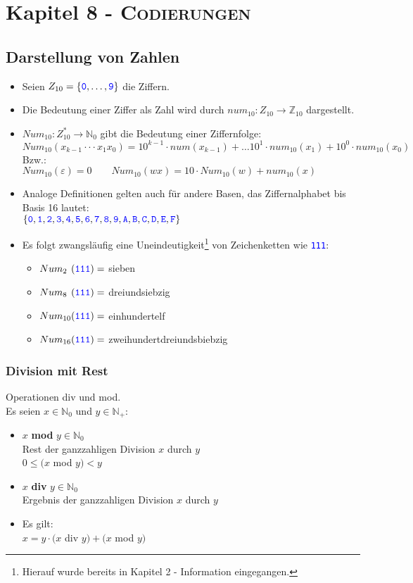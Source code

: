 \documentclass{article}
\newcommand{\N}{\mathbb{N_+}} %
\newcommand{\Nz}{{\mathbb{N}_0}} %
\newcommand{\Z}{\mathbb{Z}} %
\newcommand{\kapitel}[2]{Kapitel #1 - \textsc{#2}}
\newcommand{\blue}[1]{\textcolor{blue}{#1}}
\newcommand{\important}[1]{\textcolor{importantColor}{#1}}
\newcommand{\word}[1]{\blue{\texttt{#1}}}
\newcommand{\set}[1]{\{#1\}}
\newcommand{\anfuehrung}[1]{\flqq #1\frqq}
\begin{document}
\newpage
\section{\kapitel{8}{Codierungen}}
\subsection{Darstellung von Zahlen}
\begin{itemize}
    \item Seien $Z_{10}=\set{\word{0},\dots,\word{9}}$ die Ziffern.
    \item Die Bedeutung einer Ziffer als Zahl wird durch $num_{10}:Z_{10}\to\Z_{10}$ dargestellt.
    \item $Num_{10}:Z_{10}^*\to\Nz$ gibt die Bedeutung einer Ziffernfolge:\\
    $Num_{10}(x_{k-1}\cdot\cdot\cdot x_1x_0)=10^{k-1}\cdot num(x_{k-1})+\dots 10^1\cdot num_{10}(x_1)+10^0\cdot num_{10}(x_0)$\\
    Bzw.:\\
    $Num_{10}(\varepsilon)=0\qquad Num_{10}(wx)=10\cdot Num_{10}(w)+ num_{10}(x)$
    \item Analoge Definitionen gelten auch für andere Basen, das Ziffernalphabet bis Basis 16 lautet:\\
    $\set{\word{0},\word{1},\word{2},\word{3},\word{4},\word{5},\word{6},\word{7},\word{8},\word{9},\word{A},\word{B},\word{C},\word{D},\word{E},\word{F}}$
    \item Es folgt zwangsläufig eine Uneindeutigkeit\footnote{Hierauf wurde bereits in Kapitel 2 - Information eingegangen.} von Zeichenketten wie \word{111}:
    \begin{itemize}
        \item $Num_{2\hphantom{0}}(\word{111}) = $ \anfuehrung{sieben}
        \item $Num_{8\hphantom{0}}(\word{111}) = $ \anfuehrung{dreiundsiebzig}
        \item $Num_{10}(\word{111}) = $ \anfuehrung{einhundertelf}
        \item $Num_{16}(\word{111}) = $ \anfuehrung{zweihundertdreiundsbiebzig}
    \end{itemize}
\end{itemize}

\subsubsection{Division mit Rest}
Operationen \important{div} und \important{mod}.\\
Es seien $x\in\Nz$ und $y\in\N$:
\begin{itemize}
    \item $x$\textbf{ mod }$y \in \Nz$\\
    Rest der ganzzahligen Division $x$ durch $y$\\
    $0\leq(x$ mod $ y)<y$
    \item $x$\textbf{ div }$y \in \Nz$\\
    Ergebnis der ganzzahligen Division $x$ durch $y$
    \item Es gilt:\\
    $x=y\cdot (x$ div $y)+(x$ mod $y)$
\end{itemize}
\end{document}
